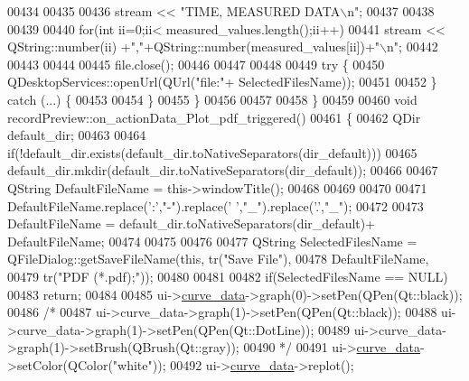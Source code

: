 \begin{DoxyCode}
00434 
00435 
00436         stream << \textcolor{stringliteral}{"TIME, MEASURED DATA\(\backslash\)n"};
00437 
00438 
00439 
00440         \textcolor{keywordflow}{for}(\textcolor{keywordtype}{int} ii=0;ii< measured\_values.length();ii++)
00441            stream << QString::number(ii) +\textcolor{stringliteral}{","}+QString::number(measured\_values[ii])+\textcolor{stringliteral}{"\(\backslash\)n"};
00442 
00443 
00444 
00445         file.close();
00446 
00447 
00448 
00449         \textcolor{keywordflow}{try} \{
00450             QDesktopServices::openUrl(QUrl(\textcolor{stringliteral}{"file:"}+ SelectedFilesName));
00451 
00452         \} \textcolor{keywordflow}{catch} (...) \{
00453 
00454         \}
00455     \}
00456 
00457 
00458 \}
00459 
00460 \textcolor{keywordtype}{void} recordPreview::on\_actionData\_Plot\_pdf\_triggered()
00461 \{
00462     QDir default\_dir;
00463 
00464     \textcolor{keywordflow}{if}(!default\_dir.exists(default\_dir.toNativeSeparators(dir\_default)))
00465         default\_dir.mkdir(default\_dir.toNativeSeparators(dir\_default));
00466 
00467     QString DefaultFileName = this->windowTitle();
00468 
00469 
00470 
00471     DefaultFileName.replace(\textcolor{charliteral}{':'},\textcolor{stringliteral}{"-"}).replace(\textcolor{charliteral}{' '},\textcolor{stringliteral}{"\_"}).replace(\textcolor{charliteral}{'.'},\textcolor{stringliteral}{"\_"});
00472 
00473     DefaultFileName = default\_dir.toNativeSeparators(dir\_default)+ DefaultFileName;
00474 
00475 
00476 
00477     QString SelectedFilesName = QFileDialog::getSaveFileName(\textcolor{keyword}{this}, tr(\textcolor{stringliteral}{"Save File"}),
00478                                                         DefaultFileName,
00479                                                          tr(\textcolor{stringliteral}{"PDF (*.pdf);"}));
00480 
00481 
00482     \textcolor{keywordflow}{if}(SelectedFilesName == NULL)
00483         \textcolor{keywordflow}{return};
00484 
00485     ui->\hyperlink{a00028_a247d94481323c0bc4f8b6458a8a535dd}{curve\_data}->graph(0)->setPen(QPen(Qt::black));
00486     \textcolor{comment}{/*}
00487 \textcolor{comment}{    ui->curve\_data->graph(1)->setPen(QPen(Qt::black));}
00488 \textcolor{comment}{    ui->curve\_data->graph(1)->setPen(QPen(Qt::DotLine));}
00489 \textcolor{comment}{    ui->curve\_data->graph(1)->setBrush(QBrush(Qt::gray));}
00490 \textcolor{comment}{    */}
00491     ui->\hyperlink{a00028_a247d94481323c0bc4f8b6458a8a535dd}{curve\_data}->setColor(QColor(\textcolor{stringliteral}{"white"}));
00492     ui->\hyperlink{a00028_a247d94481323c0bc4f8b6458a8a535dd}{curve\_data}->replot();

\end{DoxyCode}
